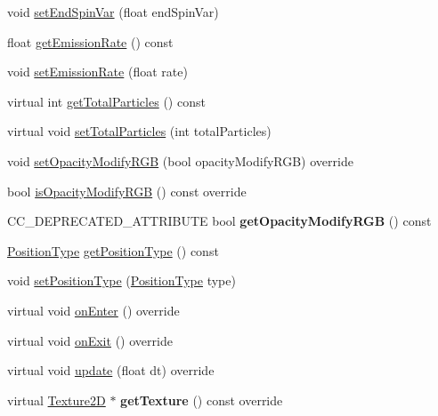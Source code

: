 \begin{DoxyCompactItemize}
void \hyperlink{classParticleSystem_a27c18cce7626182bc71b523f607587d5}{set\+End\+Spin\+Var} (float end\+Spin\+Var)
\item 
float \hyperlink{classParticleSystem_af869c4ac393b207ffaf32a3f8f9de80e}{get\+Emission\+Rate} () const
\item 
void \hyperlink{classParticleSystem_a9daefaa668017683b11e49f260f70049}{set\+Emission\+Rate} (float rate)
\item 
virtual int \hyperlink{classParticleSystem_a4a2fef62f24bc8cf75e5c4d05e464f03}{get\+Total\+Particles} () const
\item 
virtual void \hyperlink{classParticleSystem_ad406c6892022b3ec0173f1c940055ed3}{set\+Total\+Particles} (int total\+Particles)
\item 
void \hyperlink{classParticleSystem_a2c5a931c70aaa80e3fc098ec0aaf9827}{set\+Opacity\+Modify\+R\+GB} (bool opacity\+Modify\+R\+GB) override
\item 
bool \hyperlink{classParticleSystem_a36df0682b59803de36c914ce2bffe47d}{is\+Opacity\+Modify\+R\+GB} () const override
\item 
\mbox{\label{classParticleSystem_a45ee4815fe1000fefe785abdf1ce3fae}} 
C\+C\+\_\+\+D\+E\+P\+R\+E\+C\+A\+T\+E\+D\+\_\+\+A\+T\+T\+R\+I\+B\+U\+TE bool {\bfseries get\+Opacity\+Modify\+R\+GB} () const
\item 
\hyperlink{classParticleSystem_a9856f9eca1df7c6f2a2e54a1549cff27}{Position\+Type} \hyperlink{classParticleSystem_a946e4bbab07799809fd21d4d9eee8ebb}{get\+Position\+Type} () const
\item 
void \hyperlink{classParticleSystem_a4603eb21cf9e05c94d24d39cb5d21284}{set\+Position\+Type} (\hyperlink{classParticleSystem_a9856f9eca1df7c6f2a2e54a1549cff27}{Position\+Type} type)
\item 
virtual void \hyperlink{classParticleSystem_a0bf785c1b1b386e0175fd01405072ab3}{on\+Enter} () override
\item 
virtual void \hyperlink{classParticleSystem_ad4eb9130a81ad207669531f165ed6de8}{on\+Exit} () override
\item 
virtual void \hyperlink{classParticleSystem_a11a1c88736ddcd626ba8039b4268e82e}{update} (float dt) override
\item 
\mbox{\label{classParticleSystem_aa553c78ff05fe49f33463df8f29f94ff}} 
virtual \hyperlink{classTexture2D}{Texture2D} $\ast$ {\bfseries get\+Texture} () const override
\item 

\end{DoxyCompactItemize}
